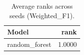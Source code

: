\begin{table}[t]
\centering
\begin{tabular}{lr}
\toprule
Model & rank \\
\midrule
random_forest & 1.0000 \\
\bottomrule
\end{tabular}
\caption{Average ranks across seeds (Weighted_F1).}
\label{tab:avg_rank_Weighted_F1}
\end{table}